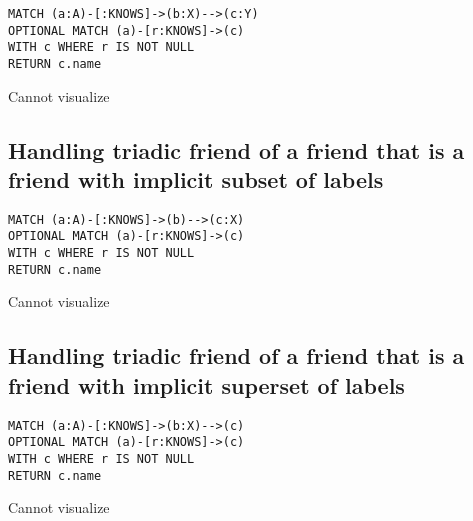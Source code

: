 \begin{lstlisting}
MATCH (a:A)-[:KNOWS]->(b:X)-->(c:Y)
OPTIONAL MATCH (a)-[r:KNOWS]->(c)
WITH c WHERE r IS NOT NULL
RETURN c.name
\end{lstlisting}

Cannot visualize
\subsection{Handling triadic friend of a friend that is a friend with implicit subset of labels}

\begin{lstlisting}
MATCH (a:A)-[:KNOWS]->(b)-->(c:X)
OPTIONAL MATCH (a)-[r:KNOWS]->(c)
WITH c WHERE r IS NOT NULL
RETURN c.name
\end{lstlisting}

Cannot visualize
\subsection{Handling triadic friend of a friend that is a friend with implicit superset of labels}

\begin{lstlisting}
MATCH (a:A)-[:KNOWS]->(b:X)-->(c)
OPTIONAL MATCH (a)-[r:KNOWS]->(c)
WITH c WHERE r IS NOT NULL
RETURN c.name
\end{lstlisting}

Cannot visualize

